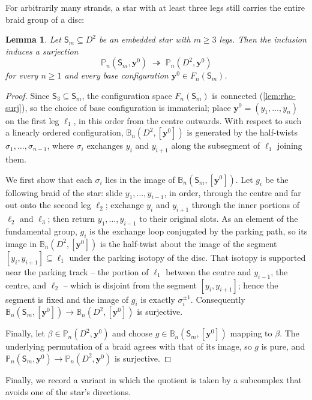 \documentclass[reqno]{amsart}
\newtheorem{lemma}[theorem]{Lemma}
\theoremstyle{definition}
\newcommand\bfy{\mathbf{y}}
\newcommand\sfS{\mathsf{S}}
\newcommand{\PB}{\mathbb{P}}
\newcommand{\BG}{\mathbb{B}}
\numberwithin{equation}{section}
\begin{document}
For arbitrarily many strands, a star with at least three legs
still carries the entire braid group of a disc:

\begin{lemma}\label{lem:star-to-disc}
Let \(\sfS_m\subseteq D^2\) be an embedded star with
\(m\geq3\) legs. Then the inclusion induces a surjection
\[
\PB_n(\sfS_m,\bfy^0)\;\twoheadrightarrow\;\PB_n(D^2,\bfy^0)
\]
for every \(n\geq1\) and every base configuration
\(\bfy^0\in F_n(\sfS_m)\).
\end{lemma}

\begin{proof}
Since \(\sfS_3\subseteq\sfS_m\), the configuration space
\(F_n(\sfS_m)\) is connected (\cref{lem:rho-surj}), so the
choice of base configuration is immaterial; place
\(\bfy^0=(y_1,\dots,y_n)\) on the first leg \(\ell_1\), in this
order from the centre outwards. With respect to such a linearly
ordered configuration, \(\BG_n(D^2,[\bfy^0])\) is generated by
the half-twists \(\sigma_1,\dots,\sigma_{n-1}\), where
\(\sigma_i\) exchanges \(y_i\) and \(y_{i+1}\) along the
subsegment of \(\ell_1\) joining them.

We first show that each \(\sigma_i\) lies in the image of
\(\BG_n(\sfS_m,[\bfy^0])\). Let \(g_i\) be the following braid
of the star: slide \(y_1,\dots,y_{i-1}\), in order, through the
centre and far out onto the second leg \(\ell_2\); exchange
\(y_i\) and \(y_{i+1}\) through the inner portions of
\(\ell_2\) and \(\ell_3\); then return \(y_1,\dots,y_{i-1}\) to
their original slots. As an element of the fundamental group,
\(g_i\) is the exchange loop conjugated by the parking path,
so its image in \(\BG_n(D^2,[\bfy^0])\) is the half-twist
about the image of the segment \([y_i,y_{i+1}]\subseteq\ell_1\)
under the parking isotopy of the disc. That isotopy is
supported near the parking track -- the portion of \(\ell_1\)
between the centre and \(y_{i-1}\), the centre, and \(\ell_2\)
-- which is disjoint from the segment \([y_i,y_{i+1}]\); hence
the segment is fixed and the image of \(g_i\) is exactly
\(\sigma_i^{\pm1}\). Consequently
\(\BG_n(\sfS_m,[\bfy^0])\to\BG_n(D^2,[\bfy^0])\) is
surjective.

Finally, let \(\beta\in\PB_n(D^2,\bfy^0)\) and choose
\(g\in\BG_n(\sfS_m,[\bfy^0])\) mapping to \(\beta\). The
underlying permutation of a braid agrees with that of its
image, so \(g\) is pure, and
\(\PB_n(\sfS_m,\bfy^0)\to\PB_n(D^2,\bfy^0)\) is surjective.
\end{proof}

Finally, we record a variant in which the quotient is taken by a
subcomplex that avoids one of the star's directions.
\end{document}
